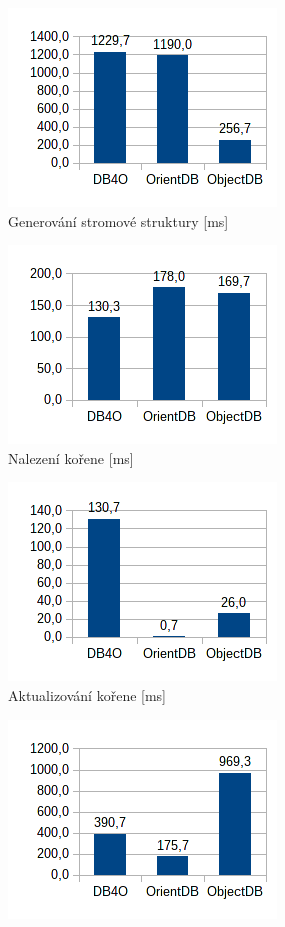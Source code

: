 \begin{figure}[!h]
  \begin{subfigure}[b]{0.5\textwidth}
  \includegraphics[]{obr/bench/oodbms1}
  \caption{Generování stromové struktury [ms]}\label{img:oodbms1}
  \end{subfigure}
  \begin{subfigure}[b]{0.5\textwidth}
  \includegraphics[]{obr/bench/oodbms2}
  \caption{Nalezení kořene [ms]}\label{img:oodbms2}
  \end{subfigure}
  \begin{subfigure}[b]{0.5\textwidth}
  \includegraphics[]{obr/bench/oodbms3}
  \caption{Aktualizování kořene [ms]}\label{img:oodbms3}
  \end{subfigure}
  \begin{subfigure}[b]{0.5\textwidth}
  \includegraphics[]{obr/bench/oodbms4}

\end{subfigure}
\end{figure}
